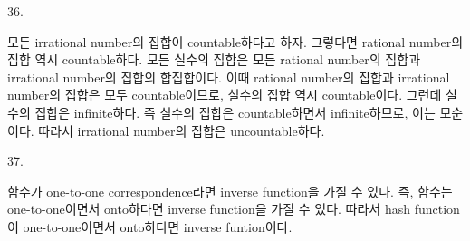 \documentclass{article}
\begin{document}
36.
\begin{addmargin}[1em]{2em}
모든 irrational number의 집합이 countable하다고 하자. 그렇다면 rational number의 집합 역시 countable하다. 모든 실수의 집합은 모든 rational number의 집합과 irrational number의 집합의 합집합이다. 이때 rational number의 집합과 irrational number의 집합은 모두 countable이므로, 실수의 집합 역시 countable이다. 그런데 실수의 집합은 infinite하다. 즉 실수의 집합은 countable하면서 infinite하므로, 이는 모순이다. 따라서 irrational number의 집합은 uncountable하다.
\end{addmargin}
\bigskip

37.
\begin{addmargin}[1em]{2em}
함수가 one-to-one correspondence라면 inverse function을 가질 수 있다. 즉, 함수는 one-to-one이면서 onto하다면 inverse function을 가질 수 있다. 따라서 hash function이 one-to-one이면서 onto하다면 inverse funtion이다.
\end{addmargin}
\bigskip
\end{document}
